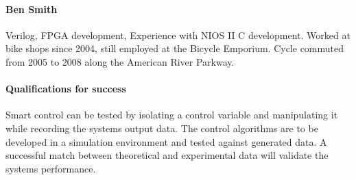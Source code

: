 \documentclass[12pt,article]{IEEEtran}
\begin{document}
    \paragraph{\bfseries Ben Smith}
    Verilog, FPGA development, Experience with NIOS II C development. Worked at bike shops since 
    2004, still employed at the Bicycle Emporium. Cycle commuted from 2005 to 2008 along the
    American River Parkway.

    \paragraph{\bfseries Qualifications for success}
        Smart control can be tested by isolating a control variable and manipulating it while recording
        the systems output data. The control algorithms are to be developed in a simulation environment and
        tested against generated data. A successful match between theoretical and experimental data will
        validate the systems performance.
\end{document}
